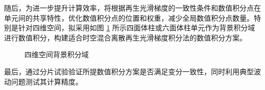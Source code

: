 随后，为进一步提升计算效率，将根据再生光滑梯度的一致性条件和数值积分点在单元间的共享特性，优化数值积分点的位置和权重，减少全局数值积分点数量。特别是针对四维空间，拟采用如图 \ref{fg:domain} 所示四面体柱或六面体柱单元作为背景积分域进行数值积分，构建适合时空混合离散再生光滑梯度积分法的数值积分方案。

\begin{figure}[!h]
    \centering 
    \hspace{24pt}
    \caption{四维空间背景积分域}
    \label{fg:domain}
\end{figure}

最后，通过分片试验验证所提数值积分方案是否满足变分一致性，同时利用典型波动问题测试其计算精度。


